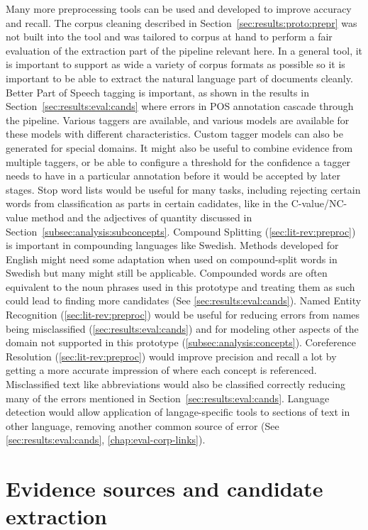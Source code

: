 \documentclass[a4paper]{report}
\begin{document}
Many more preprocessing tools can be used and developed to improve accuracy and recall.
The corpus cleaning described in Section~\ref{sec:results:proto:prepr} was not built into the tool and was tailored to corpus at hand to perform a fair evaluation of the extraction part of the pipeline relevant here.
In a general tool, it is important to support as wide a variety of corpus formats as possible so it is important to be able to extract the natural language part of documents cleanly.
Better Part of Speech tagging is important, as shown in the results in Section~\ref{sec:results:eval:cands} where errors in POS annotation cascade through the pipeline.
Various taggers are available, and various models are available for these models with different characteristics.
Custom tagger models can also be generated for special domains.
It might also be useful to combine evidence from multiple taggers, or be able to configure a threshold for the confidence a tagger needs to have in a particular annotation before it would be accepted by later stages.
Stop word lists would be useful for many tasks, including rejecting certain words from classification as parts in certain cadidates, like in the C-value/NC-value method and the adjectives of quantity discussed in Section~\ref{subsec:analysis:subconcepts}.
Compound Splitting (\ref{sec:lit-rev:preproc}) is important in compounding languages like Swedish.
Methods developed for English might need some adaptation when used on compound-split words in Swedish but many might still be applicable.
Compounded words are often equivalent to the noun phrases used in this prototype and treating them as such could lead to finding more candidates (See \ref{sec:results:eval:cands}).
Named Entity Recognition (\ref{sec:lit-rev:preproc}) would be useful for reducing errors from names being misclassified (\ref{sec:results:eval:cands}) and for modeling other aspects of the domain not supported in this prototype (\ref{subsec:analysis:concepts}).
Coreference Resolution (\ref{sec:lit-rev:preproc}) would improve precision and recall a lot by getting a more accurate impression of where each concept is referenced.
Misclassified text like abbreviations would also be classified correctly reducing many of the errors mentioned in Section~\ref{sec:results:eval:cands}.
Language detection would allow application of langage-specific tools to sections of text in other language, removing another common source of error (See \ref{sec:results:eval:cands}, \ref{chap:eval-corp-links}).

\section{Evidence sources and candidate extraction}
\end{document}
